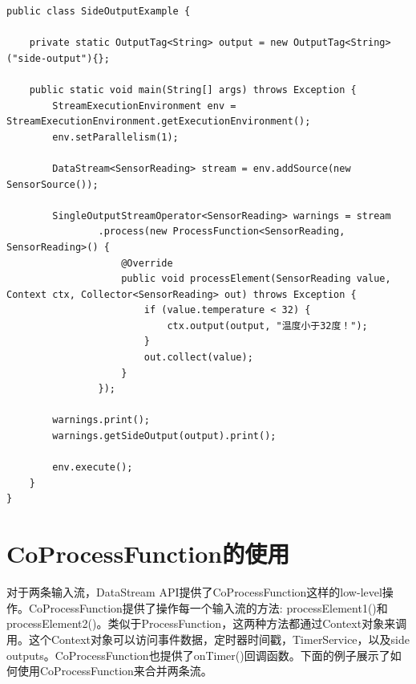 \documentclass[cn,11pt,chinese]{elegantbook}
\begin{document}
\begin{verbatim}
public class SideOutputExample {

    private static OutputTag<String> output = new OutputTag<String>("side-output"){};

    public static void main(String[] args) throws Exception {
        StreamExecutionEnvironment env = StreamExecutionEnvironment.getExecutionEnvironment();
        env.setParallelism(1);

        DataStream<SensorReading> stream = env.addSource(new SensorSource());

        SingleOutputStreamOperator<SensorReading> warnings = stream
                .process(new ProcessFunction<SensorReading, SensorReading>() {
                    @Override
                    public void processElement(SensorReading value, Context ctx, Collector<SensorReading> out) throws Exception {
                        if (value.temperature < 32) {
                            ctx.output(output, "温度小于32度！");
                        }
                        out.collect(value);
                    }
                });

        warnings.print();
        warnings.getSideOutput(output).print();

        env.execute();
    }
}
\end{verbatim}

\section{CoProcessFunction的使用}

对于两条输入流，DataStream API提供了CoProcessFunction这样的low-level操作。CoProcessFunction提供了操作每一个输入流的方法: processElement1()和processElement2()。类似于ProcessFunction，这两种方法都通过Context对象来调用。这个Context对象可以访问事件数据，定时器时间戳，TimerService，以及side outputs。CoProcessFunction也提供了onTimer()回调函数。下面的例子展示了如何使用CoProcessFunction来合并两条流。
\end{document}
